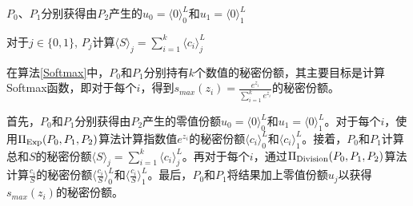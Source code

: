\begin{algorithm}[H]
	\SetAlgoLined
	
	
	$P_0$、$P_1$分别获得由$P_2$产生的$u_0=\langle 0\rangle_0^L$和$u_1=\langle 0\rangle_1^L$
	
	
	对于$j\in \{0, 1\}$, $P_j$计算$\langle S\rangle_j=\sum_{i=1}^k\langle c_i\rangle_j^L$
	
	
	\caption{ $\Pi_{\rm Softmax}(\{P_0, P_1\}, P_2)$ }
	\label{Softmax}
\end{algorithm}

在算法\ref{Softmax}中，$P_0$和$P_1$分别持有$k$个数值的秘密份额，其主要目标是计算Softmax函数，即对于每个$i$，得到$s_{max}(z_i) = \frac{e^{z_i}}{\sum_{i=1}^k e^{z_i}}$的秘密份额。

首先，$P_0$和$P_1$分别获得由$P_2$产生的零值份额$u_0=\langle 0\rangle_0^L$和$u_1=\langle 0\rangle_1^L$。对于每个$i$，使用$\Pi_{\rm Exp}({P_0, P_1}, P_2)$算法计算指数值$e^{z_i}$的秘密份额$\langle c_i\rangle_0^L$和$\langle c_i\rangle_1^L$。接着，$P_0$和$P_1$计算总和$S$的秘密份额$\langle S\rangle_j=\sum_{i=1}^k\langle c_i\rangle_j^L$。再对于每个$i$，通过$\Pi_{\rm Division}({P_0, P_1}, P_2)$算法计算$\frac{c_i}{S}$的秘密份额$\langle \frac{c_i}{S}\rangle_0^L$和$\langle \frac{c_i}{S}\rangle_1^L$。最后，$P_0$和$P_1$将结果加上零值份额$u_j$以获得$s_{max}(z_i)$的秘密份额。


